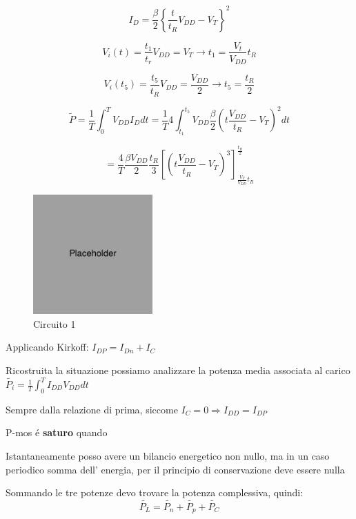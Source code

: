 \documentclass{article}
\begin{document}
\begin{samepage}
\[
    I_{D} = \frac{\beta}{2}\left\{\frac{t}{t_R} V_{DD} - V_{T} \right\}^2
\]

\[
    V_i(t) = \frac{t_1}{t_r} V_{DD} = V_T \rightarrow t_1 = \frac{V_t}{V_{DD}} t_R
\]

\[
    V_i(t_5) = \frac{t_5}{t_R} V_{DD} = \frac{V_{DD}}{2} \rightarrow t_5 = \frac{t_R}{2}
\]

\[
    \tilde{P} = \frac{1}{T}\int_{0}^{T} V_{DD}I_{D}dt =
    \frac{1}{T} 4 \int_{t_1}^{t_5} V_{DD} \frac{\beta}{2} \left( t \frac{V_{DD}}{t_R} - V_T\right) ^2 dt
\]

\[
    =\frac{4}{T} \frac{\beta V_{DD}}{2} \frac{t_R}{3}
    \left[ \left( t \frac{V_{DD}}{t_R} - V_T\right)^3\right]^{\frac{t_R}{2}}_{\frac{V_T}{V_{DD}} t_R }
\]


\end{samepage}

\begin{figure}[h]
    \centering
    \includegraphics[width=1.8in]{placeholder.jpg}
    \caption{Circuito 1}
\end{figure}

Applicando Kirkoff: $I_{DP} = I_{Dn} + I_C$

Ricostruita la situazione possiamo analizzare la potenza media associata al carico $\tilde{P_i} = \frac{1}{T}\int_0^T I_{DD} V_{DD} dt $

Sempre dalla relazione di prima, siccome $I_C = 0 \Rightarrow I_{DD} = I_{DP}$


P-mos \'e \textbf{saturo} quando 

Istantaneamente posso avere un bilancio energetico non nullo, ma in un caso periodico somma dell' energia, per il principio di conservazione deve essere nulla

Sommando le tre potenze devo trovare la potenza complessiva, quindi:
\[
    \tilde{P_L} = \tilde{P_n} + \tilde{P_p} + \tilde{P_C}
\]
\end{document}

